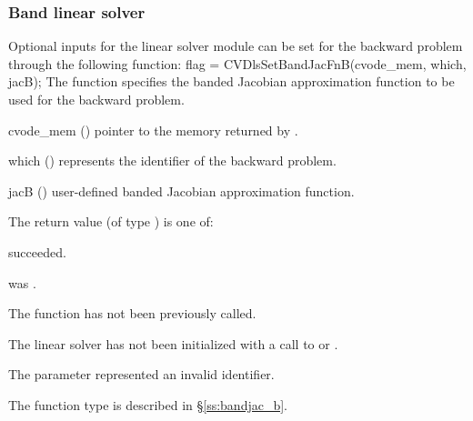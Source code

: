 \subsubsection{Band linear solver}
Optional inputs for the {\cvband} linear solver module can be set for the backward
problem through the following function:
{
  flag = CVDlsSetBandJacFnB(cvode\_mem, which, jacB);
}
{
  The function  specifies the banded Jacobian
  approximation function to be used for the backward problem.
}
{
  \begin{args}
  \item[cvode\_mem] ()
    pointer to the {\cvodes} memory returned by .
  \item[which] ()
    represents the identifier of the backward problem.
  \item[jacB] ()
    user-defined banded Jacobian approximation function.
  \end{args}
}
{
  The return value  (of type ) is one of:
  \begin{args}
  \item[\Id{CVDLS\_SUCCESS}] 
     succeeded.
  \item[\Id{CVDLS\_MEM\_NULL}]
     was .
  \item[\Id{CVDLS\_NO\_ADJ}]
    The function  has not been previously called.
  \item[\Id{CVDLS\_LMEM\_NULL}]
    The linear solver has not been initialized with a call to 
    or .
  \item[\Id{CVDLS\_ILL\_INPUT}]
    The parameter  represented an invalid identifier.
  \end{args}
}
{
  The function type  is described in \S\ref{ss:bandjac_b}.
}

